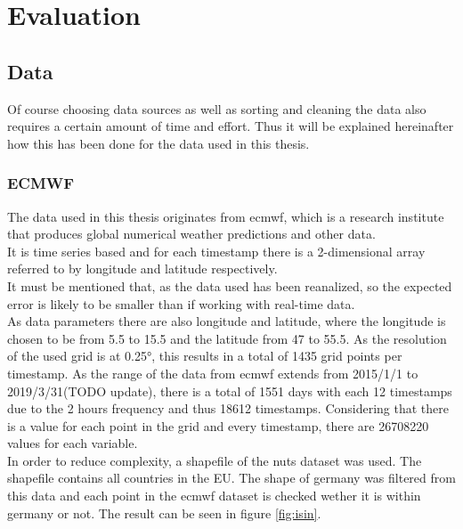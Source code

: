 \chapter{Evaluation}
\label{ch:Evaluation}

\section{Data}
\label{sec:data}

Of course choosing data sources as well as sorting and cleaning the data also requires a certain amount of time and effort. Thus it will be explained hereinafter how this has been done for the data used in this thesis.

\subsection{ECMWF}

The data used in this thesis originates from \acrshort{ecmwf}, which is a research institute that produces global numerical weather predictions and other data.\\
It is time series based and for each timestamp there is a 2-dimensional array referred to by longitude and latitude respectively.\\

It must be mentioned that, as the data used has been reanalized, so the expected error is likely to be smaller than if working with real-time data.\\

As data parameters there are also longitude and latitude, where the longitude is chosen to be from 5.5 to 15.5 and the latitude from 47 to 55.5. As the resolution of the used grid is at 0.25°, this results in a total of 1435 grid points per timestamp. As the range of the data from \acrshort{ecmwf} extends from 2015/1/1 to 2019/3/31(TODO update), there is a total of 1551 days with each 12 timestamps due to the 2 hours frequency and thus 18612 timestamps. Considering that there is a value for each point in the grid and every timestamp, there are 26708220 values for each variable.\\

In order to reduce complexity, a shapefile of the \acrshort{nuts} dataset was used. The shapefile contains all countries in the EU. The shape of germany was filtered from this data and each point in the \acrshort{ecmwf} dataset is checked wether it is within germany or not. The result can be seen in figure \ref{fig:isin}.\\

